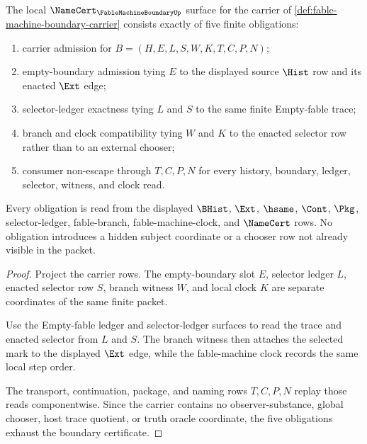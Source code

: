 \begin{theorem}
\label{thm:fable-machine-boundary-namecert-obligations}
The local $\NameCert_{\FableMachineBoundaryUp}$ surface for the carrier of \autoref{def:fable-machine-boundary-carrier} consists exactly of five finite obligations:
\begin{enumerate}
\item carrier admission for $B=(H,E,L,S,W,K,T,C,P,N)$;
\item empty-boundary admission tying $E$ to the displayed source $\Hist$ row and its enacted $\Ext$ edge;
\item selector-ledger exactness tying $L$ and $S$ to the same finite Empty-fable trace;
\item branch and clock compatibility tying $W$ and $K$ to the enacted selector row rather than to an external chooser;
\item consumer non-escape through $T,C,P,N$ for every history, boundary, ledger, selector, witness, and clock read.
\end{enumerate}
Every obligation is read from the displayed $\BHist$, $\Ext$, $\hsame$, $\Cont$, $\Pkg$, selector-ledger, fable-branch, fable-machine-clock, and $\NameCert$ rows. No obligation introduces a hidden subject coordinate or a chooser row not already visible in the packet.
\end{theorem}
\begin{proof}
Project the carrier rows. The empty-boundary slot $E$, selector ledger $L$, enacted selector row $S$, branch witness $W$, and local clock $K$ are separate coordinates of the same finite packet.

Use the Empty-fable ledger and selector-ledger surfaces to read the trace and enacted selector from $L$ and $S$. The branch witness then attaches the selected mark to the displayed $\Ext$ edge, while the fable-machine clock records the same local step order.

The transport, continuation, package, and naming rows $T,C,P,N$ replay those reads componentwise. Since the carrier contains no observer-substance, global chooser, host trace quotient, or truth oracle coordinate, the five obligations exhaust the boundary certificate.
\end{proof}

